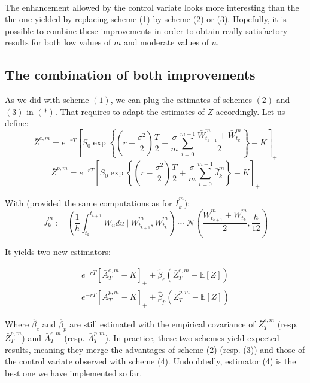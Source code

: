 \documentclass{article}
\begin{document}
\

The enhancement allowed by the control variate looks more interesting than the the one yielded by replacing
scheme (1) by scheme (2) or (3). Hopefully, it is possible to combine these improvements in order to obtain really
satisfactory results for both low values of $m$ and moderate values of $n$.

\subsection{The combination of both improvements}

As we did with scheme $(1)$, we can plug the estimates of schemes $(2)$ and $(3)$ in $(\ast)$. That requires
to adapt the estimates of $Z$ accordingly. Let us define:
\begin{equation}
	\bar Z^{e, m} = e^{-rT} \left[ S_0 \exp \left\{ \left( r - \frac{\sigma^2}{2} \right) \frac{T}{2} +
		\frac{\sigma}{m} \sum_{i=0}^{m-1} \frac{\bar W_{t_{k+1}}^m + \bar W_{t_k}^m}{2} \right\} - K \right]_+
	\tag{$ii$}
\end{equation}
\begin{equation}
	\bar Z^{p, m} = e^{-rT} \left[ S_0 \exp \left\{ \left( r - \frac{\sigma^2}{2} \right) \frac{T}{2} +
		\frac{\sigma}{m} \sum_{i=0}^{m-1} \bar J_k^m \right\} - K \right]_+
	\tag{$iii$}
\end{equation}

With (provided the same computations as for $\bar I_k^m$):
\[
	\bar J_k^m := \left( \frac{1}{h} \int_{t_k}^{t_{k+1}} \bar W_u du \ \Big\vert \ \bar W_{t_{k+1}}^m, \bar W_{t_k}^m \right)
	\sim \mathcal N \left( \frac{\bar W_{t_{k+1}}^m + \bar W_{t_k}^m}{2}, \frac{h}{12} \right)
\]

It yields two new estimators:

\begin{align}
	e^{-rT} \left[ \bar A_T^{e, m} - K \right]_+ + \hat\beta_e \left( \bar Z_T^{e, m} - \mathbb E [Z] \right)
	\tag{5} \\
	e^{-rT} \left[ \bar A_T^{p, m} - K \right]_+ + \hat\beta_p \left( \bar Z_T^{p, m} - \mathbb E [Z] \right)
	\tag{6}
\end{align}

\noindent Where $\hat\beta_e$ and $\hat\beta_p$ are still estimated with the empirical covariance of
$\bar Z_T^{e, m}$ (resp. $\bar Z_T^{p, m}$) and $\bar A_T^{e, m}$ (resp. $\bar A_T^{p, m}$). In practice, these two
schemes yield expected results, meaning they merge the advantages of scheme (2) (resp. (3)) and those of
the control variate observed with scheme (4). Undoubtedly, estimator (4) is the best one we have implemented so far.
\end{document}
